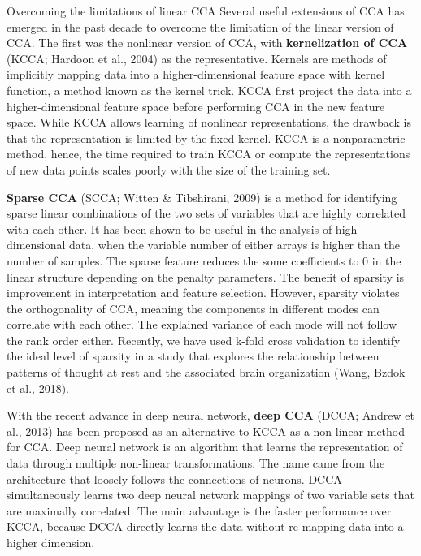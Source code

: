 \begin{infobox}{Overcoming the limitations of linear CCA}
Several useful extensions of CCA has emerged in the past decade to overcome the limitation of the linear version of CCA. The first was the nonlinear version of CCA, with \textbf{kernelization of CCA} (KCCA; Hardoon et al., 2004) as the representative.  Kernels are methods of implicitly mapping data into a higher-dimensional feature space with kernel function, a method known as the kernel trick. KCCA first project the data into a higher-dimensional feature space before performing CCA in the new feature space.  While KCCA allows learning of nonlinear representations, the drawback is that the representation is limited by the fixed kernel. KCCA is a nonparametric method, hence, the time required to train KCCA or compute the representations of new data points scales poorly with the size of the training set.

\textbf{Sparse CCA} (SCCA; Witten \& Tibshirani, 2009) is a method for identifying sparse linear combinations of the two sets of variables that are highly correlated with each other. It has been shown to be useful in the analysis of high-dimensional data, when the variable number of either arrays is higher than the number of samples. The sparse feature reduces the some coefficients to 0 in the linear structure depending on the penalty parameters. The benefit of sparsity is improvement in interpretation and feature selection. However, sparsity violates the orthogonality of CCA, meaning the components in different modes can correlate with each other. The explained variance of each mode will not follow the rank order either. Recently, we have used k-fold cross validation to identify the ideal level of sparsity in a study that explores the relationship between patterns of thought at rest and the associated brain organization (Wang, Bzdok et al., 2018).

With the recent advance in deep neural network, \textbf{deep CCA} (DCCA; Andrew et al., 2013) has been proposed as an alternative to KCCA as a non-linear method for CCA. Deep neural network is an algorithm that learns the representation of data through multiple non-linear transformations. The name came from the architecture that loosely follows the connections of neurons. DCCA simultaneously learns two deep neural network mappings of two variable sets that are maximally correlated. The main advantage is the faster performance over KCCA, because DCCA directly learns the data without re-mapping data into a higher dimension. 
\end{infobox}






